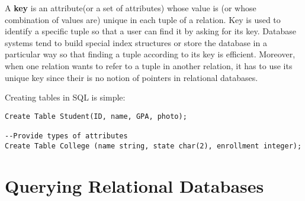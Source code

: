 A \textbf{key} is an attribute(or a set of attributes) whose value is (or whose combination of values are) unique in each tuple of a relation. Key is used to identify a specific tuple so that a user can find it by asking for its key. Database systems tend to build special index structures or store the database in a particular way so that finding a tuple according to its key is efficient. Moreover, when one relation wants to refer to a tuple in another relation, it has to use its unique key since their is no notion of pointers in relational databases.

Creating tables in SQL is simple:
\begin{lstlisting}
Create Table Student(ID, name, GPA, photo);

--Provide types of attributes
Create Table College (name string, state char(2), enrollment integer);
\end{lstlisting}
\section{Querying Relational Databases}

\ifx\PREAMBLE\undefined

\fi